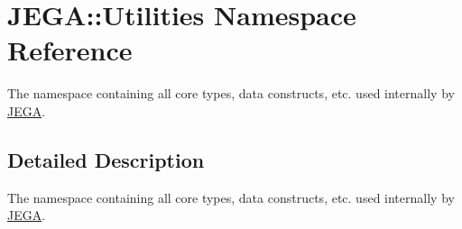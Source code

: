 \hypertarget{namespaceJEGA_1_1Utilities}{}\section{J\+E\+GA\+:\+:Utilities Namespace Reference}
\label{namespaceJEGA_1_1Utilities}


The namespace containing all core types, data constructs, etc. used internally by \hyperlink{namespaceJEGA}{J\+E\+GA}.  




\subsection{Detailed Description}
The namespace containing all core types, data constructs, etc. used internally by \hyperlink{namespaceJEGA}{J\+E\+GA}. 